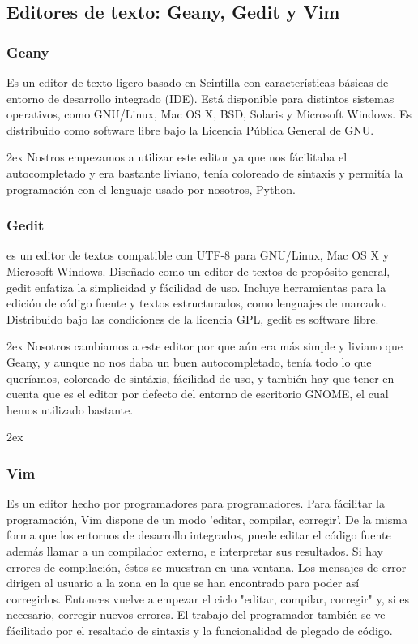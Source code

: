 \documentclass[12pt,a4papert,woside,openright,titlepage,final]{book}
\begin{document}
\subsection{Editores de texto: Geany, Gedit y Vim}

\subsubsection{Geany} 

Es un editor de texto ligero basado en Scintilla con características básicas de
entorno de desarrollo integrado (IDE). Está disponible para distintos sistemas
operativos, como GNU/Linux, Mac OS X, BSD, Solaris y Microsoft Windows.  Es
distribuido como software libre bajo la Licencia Pública General de GNU.

\parskip 2ex
Nostros empezamos a utilizar este editor ya que nos fácilitaba el autocompletado
y era bastante liviano, tenía coloreado de sintaxis y permitía la programación
con el lenguaje usado por nosotros, Python. 

\subsubsection{Gedit}

es un editor de textos compatible con UTF-8 para GNU/Linux, Mac OS X y Microsoft
Windows. Diseñado como un editor de textos de propósito general, gedit enfatiza
la simplicidad y fácilidad de uso. Incluye herramientas para la edición de
código fuente y textos estructurados, como lenguajes de marcado. Distribuido
bajo las condiciones de la licencia GPL, gedit es software libre. 

\parskip 2ex
Nosotros cambiamos a este editor por que aún era más simple y liviano que Geany,
y aunque no nos daba un buen autocompletado, tenía todo lo que queríamos,
coloreado de sintáxis, fácilidad de uso, y también hay que tener en cuenta que
es el editor por defecto del entorno de escritorio GNOME, el cual hemos
utilizado bastante. 

\parskip 2ex

\subsubsection{Vim}

Es un editor hecho por programadores para programadores. Para fácilitar la
programación, Vim dispone de un modo 'editar, compilar, corregir'.  De la misma
forma que los entornos de desarrollo integrados, puede editar el código fuente
además llamar a un compilador externo, e interpretar sus resultados. Si hay
errores de compilación, éstos se muestran en una ventana. Los mensajes de error
dirigen al usuario a la zona en la que se han encontrado para poder así
corregirlos. Entonces vuelve a empezar el ciclo "editar, compilar, corregir" y,
si es necesario, corregir nuevos errores. El trabajo del programador también se
ve fácilitado por el resaltado de sintaxis y la funcionalidad de plegado de
código.
\end{document}
